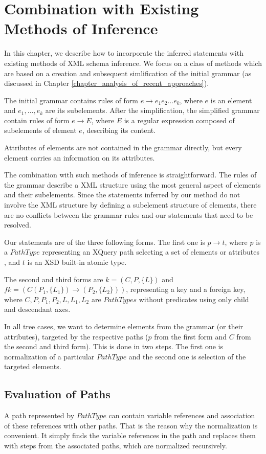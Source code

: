 \chapter{Combination with Existing Methods of Inference}

In this chapter, we describe how to incorporate the inferred statements with existing methods of XML schema inference. We focus on a class of methods which are based on a creation and subsequent simlification of the initial grammar (as discussed in Chapter \ref{chapter_analysis_of_recent_approaches}).

The initial grammar contains rules of form $e \rightarrow e_1e_2\dots e_k$, where $e$ is an element and $e_1, \dots , e_k$ are its subelements. After the simplification, the simplified grammar contain rules of form $e \rightarrow E$, where $E$ is a regular expression composed of subelements of element $e$, describing its content.

Attributes of elements are not contained in the grammar directly, but every element carries an information on its attributes.

The combination with such methods of inference is straightforward. The rules of the grammar describe a XML structure using the most general aspect of elements and their subelements. Since the statements inferred by our method do not involve the XML structure by defining a subelement structure of elements, there are no conflicts between the grammar rules and our statements that need to be resolved.

Our statements are of the three following forms. The first one is $p \rightarrow t$, where $p$ is a $PathType$ representing an XQuery path selecting a set of elements or attributes 
, and $t$ is an XSD built-in atomic type.

The second and third forms are $k = (C,P,\{L\})$ and $fk = (C(P_1,\{L_1\}) \rightarrow (P_2,\{L_2\}))$, representing a key and a foreign key, where $C,P,P_1,P_2,L,L_1,L_2$ are $PathTypes$ without predicates using only child and descendant axes.

In all tree cases, we want to determine elements from the grammar (or their attributes), targeted by the respective paths ($p$ from the first form and $C$ from the second and third form). This is done in two steps. The first one is normalization of a particular $PathType$ and the second one is selection of the targeted elements.

\section{Evaluation of Paths}
A path represented by $PathType$ can contain variable references and association of these references with other paths. That is the reason why the normalization is convenient. It simply finds the variable references in the path and replaces them with steps from the associated paths, which are normalized recursively.

